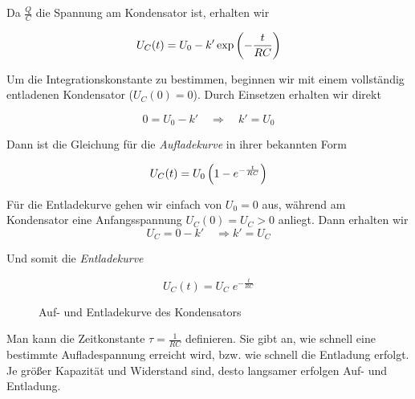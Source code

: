 Da $\frac{Q}{C}$ die Spannung am Kondensator ist, erhalten wir

\begin{equation}
  U_C(t) = U_0 - k' \exp \del{-\frac{t}{RC}}
\end{equation}

Um die Integrationskonstante zu bestimmen, beginnen wir mit einem vollständig
entladenen Kondensator ($U_C(0) = 0$). Durch Einsetzen erhalten wir direkt

\begin{equation}
  0 = U_0 - k' \quad \Rightarrow \quad k' = U_0
\end{equation}

Dann ist die Gleichung für die \textit{Aufladekurve} in ihrer bekannten Form

\begin{equation}
  U_C(t) = U_0 \del{1 - e^{-\frac{t}{RC}}}
\end{equation}

Für die Entladekurve gehen wir einfach von $U_0 = 0$ aus, während am
Kondensator eine Anfangsspannung $U_C(0) = U_C > 0$ anliegt. Dann erhalten wir
\begin{equation}
  U_C = 0 - k' \quad \Rightarrow k' = U_C
\end{equation}

Und somit die \textit{Entladekurve}

\begin{equation}
  U_C(t) = U_C \; e^{-\frac{t}{RC}}
\end{equation}

\begin{figure}[H]
  \begin{center}
    \caption{Auf- und Entladekurve des Kondensators}
  \end{center}
\end{figure}

Man kann die Zeitkonstante $\tau = \frac{1}{RC}$ definieren. Sie gibt an, wie
schnell eine bestimmte Aufladespannung erreicht wird, bzw. wie schnell die
Entladung erfolgt. Je größer Kapazität und Widerstand sind, desto langsamer
erfolgen Auf- und Entladung.

